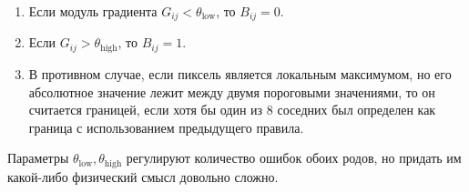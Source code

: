 \begin{enumerate}
\begin{enumerate}
    \item
        Если модуль градиента $G_{ij} < \theta_{\mathrm{low}}$, то $B_{ij} = 0$.
    \item
        Если $G_{ij} > \theta_{\mathrm{high}}$, то $B_{ij} = 1$.
    \item
        В противном случае, если пиксель является локальным максимумом, но его абсолютное значение лежит между двумя пороговыми значениями, то он считается границей, если хотя бы один из 8 соседних был определен как граница с использованием предыдущего правила.
    \end{enumerate}
    
    Параметры $\theta_{\mathrm{low}}, \theta_{\mathrm{high}}$ регулируют количество ошибок обоих родов, но придать им какой-либо физический смысл довольно сложно.
\end{enumerate}

